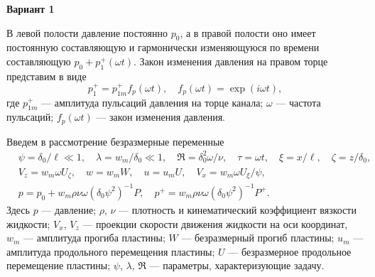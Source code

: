 \documentclass[a4paper,12pt]{article}
\begin{document}
\textbf{Вариант 1}

В левой полости давление постоянно $p_0$, а в правой полости оно имеет постоянную
составляющую и гармонически изменяющуюся по времени составляющую $p_0 + p_1^+(\omega t)$.
Закон изменения давления на правом торце представим в виде
\begin{equation}
    p_1^+ = p_{1m}^+ f_p(\omega t), \quad f_p(\omega t) = \exp(i\omega t),
\end{equation}
где $p_{1m}^+$ — амплитуда пульсаций давления на торце канала; $\omega$ — частота пульсаций;
$f_p(\omega t)$ — закон изменения давления.

Введем в рассмотрение безразмерные переменные
\begin{equation}
\begin{aligned}
    &\psi = \delta_0/\ell \ll 1, \quad \lambda = w_m/\delta_0 \ll 1, \quad
     \Re = \delta_0^2 \omega / \nu, \quad \tau = \omega t, \quad
     \xi = x/\ell, \quad \zeta = z/\delta_0, \\
    &V_z = w_m \omega U_\zeta, \quad w = w_m W, \quad u = u_m U, \quad
     V_x = w_m \omega U_\xi / \psi, \\
    &p = p_0 + w_m \rho \nu \omega (\delta_0 \psi^2)^{-1} P, \quad
     p^+ = w_m \rho \nu \omega (\delta_0 \psi^2)^{-1} P^+.
\end{aligned}
\end{equation}
Здесь $p$ — давление; $\rho$, $\nu$ — плотность и кинематический коэффициент вязкости
жидкости; $V_x$, $V_z$ — проекции скорости движения жидкости на оси координат,
$w_m$ — амплитуда прогиба пластины; $W$ — безразмерный прогиб пластины;
$u_m$ — амплитуда продольного перемещения пластины; $U$ — безразмерное продольное
перемещение пластины; $\psi$, $\lambda$, $\Re$ — параметры, характеризующие задачу.
\end{document}
